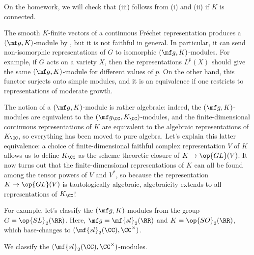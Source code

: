 \documentclass[../notes.tex]{subfiles}
\begin{document}
\begin{remark}
	On the homework, we will check that (iii) follows from (i) and (ii) if $K$ is connected.
\end{remark}
\begin{example}
	The smooth $K$-finite vectors of a continuous Fr\'echet representation produces a $(\mf g,K)$-module by , but it is not faithful in general. In particular, it can send non-isomorphic representations of $G$ to isomorphic $(\mf g,K)$-modules. For example, if $G$ acts on a variety $X$, then the representations $L^p(X)$ should give the same $(\mf g,K)$-module for different values of $p$. On the other hand, this functor surjects onto simple modules, and it is an equivalence if one restricts to representations of moderate growth.
\end{example}
\begin{remark}
	The notion of a $(\mf g,K)$-module is rather algebraic: indeed, the $(\mf g,K)$-modules are equivalent to the $(\mf g_\CC,K_\CC)$-modules, and the finite-dimensional continuous representations of $K$ are equivalent to the algebraic representations of $K_\CC$, so everything has been moved to pure algebra. Let's explain this latter equivalence: a choice of finite-dimensional faithful complex representation $V$ of $K$ allows us to define $K_\CC$ as the scheme-theoretic closure of $K\to\op{GL}(V)$. It now turns out that the finite-dimensional representations of $K$ can all be found among the tensor powers of $V$ and $V^*$, so because the representation $K\to\op{GL}(V)$ is tautologically algebraic, algebraicity extends to all representations of $K_\CC$!
\end{remark}
For example, let's classify the $(\mf g,K)$-modules from the group $G=\op{SL}_2(\RR)$. Here, $\mf g=\mf{sl}_2(\RR)$ and $K=\op{SO}_2(\RR)$, which base-changes to $(\mf{sl}_2(\CC),\CC^\times)$.
\begin{example}
	We classify the $(\mf{sl}_2(\CC),\CC^\times)$-modules.
\end{example}
\end{document}
